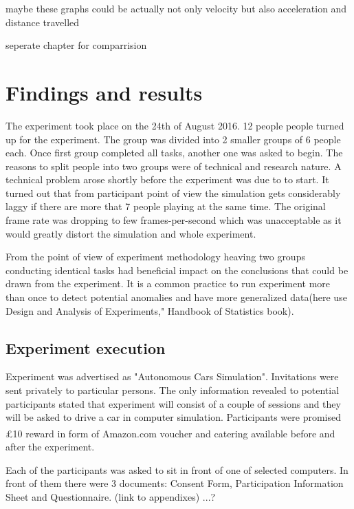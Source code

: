 \documentclass[11pt,english]{article}
\begin{document}
maybe these graphs could be actually not only velocity but also acceleration and distance travelled




seperate chapter for comparrision



\section{Findings and results}


The experiment took place on the 24th of August 2016. 12 people people turned up for the experiment. The group was divided into 2 smaller groups of 6 people each. Once first group completed all tasks, another one was asked to begin. The reasons to split people into two groups were of technical and research nature. A technical problem arose shortly before the experiment was due to to start. It turned out that from participant point of view the simulation gets considerably laggy if there are more that 7 people playing at the same time. The original frame rate was dropping to few frames-per-second which was unacceptable as it would greatly distort the simulation and whole experiment.

From the point of view of experiment methodology heaving two groups conducting identical tasks had beneficial impact on the conclusions that could be drawn from the experiment. It is a common practice to run experiment more than once to detect potential anomalies and have more generalized data(here use Design and Analysis of Experiments," Handbook of Statistics book).



\subsection{Experiment execution}


Experiment was advertised as "Autonomous Cars Simulation". Invitations were sent privately to particular persons. The only information revealed to potential participants stated that experiment will consist of a couple of sessions and they will be asked to drive a car in computer simulation. Participants were promised £10 reward in form of Amazon.com\textsuperscript{\textregistered} voucher and catering available before and after the experiment.


Each of the participants was asked to sit in front of one of selected computers. In front of them there were 3 documents: Consent Form, Participation Information Sheet and Questionnaire. (link to appendixes)
...?
\end{document}
